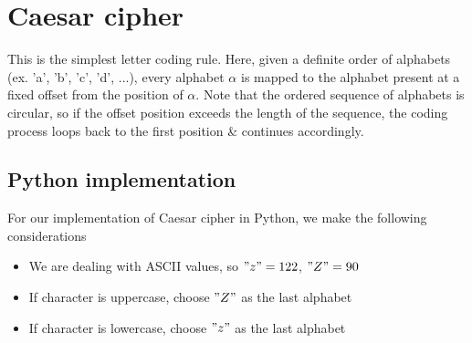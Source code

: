 \section{Caesar cipher}
This is the simplest letter coding rule. Here, given a definite order of alphabets (ex. 'a', 'b', 'c', 'd', ...), every alphabet $\alpha$ is mapped to the alphabet present at a fixed offset from the position of $\alpha$. Note that the ordered sequence of alphabets is circular, so if the offset position exceeds the length of the sequence, the coding process loops back to the first position \& continues accordingly.

\subsection{Python implementation}
For our implementation of Caesar cipher in Python, we make the following considerations
\begin{itemize}
	\item We are dealing with ASCII values, so $"z" = 122$, $"Z" = 90$
	\item If character is uppercase, choose $"Z"$ as the last alphabet
	\item If character is lowercase, choose $"z"$ as the last alphabet
\end{itemize}

